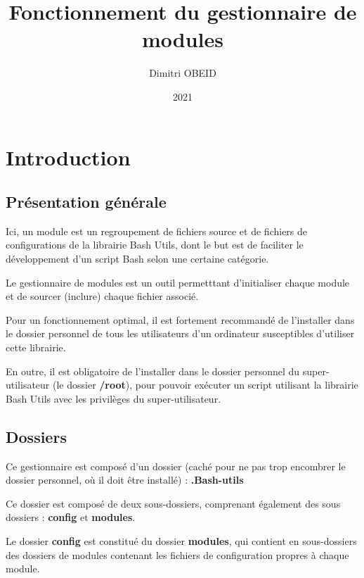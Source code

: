 \documentclass[a4paper,10pt]{article}
\title{\color{red}Fonctionnement du gestionnaire de modules}\color{white}
\author{Dimitri OBEID}
\date{2021}
\begin{document}
 \maketitle
 \tableofcontents
 \newpage

 \color{red}
 \section{Introduction}\color{white}

  \color{green}
  \subsection{Présentation générale}\color{white}
  Ici, un module est un regroupement de fichiers source et de fichiers de configurations de la librairie Bash Utils, dont le but est de faciliter le développement d'un script Bash selon une certaine catégorie.\linebreak

  Le gestionnaire de modules est un outil permetttant d'initialiser chaque module et de sourcer (inclure) chaque fichier associé.\linebreak

  Pour un fonctionnement optimal, il est fortement recommandé de l'installer dans le dossier personnel de tous les utilisateurs d'un ordinateur susceptibles d'utiliser cette librairie.\linebreak

  En outre, il est obligatoire de l'installer dans le dossier personnel du super-utilisateur (le dossier \textbf{\color{lime}/root\color{white}}), pour pouvoir exécuter un script utilisant la librairie Bash Utils avec les privilèges du super-utilisateur.

  \color{green}
  \subsection{Dossiers}\color{white}
  Ce gestionnaire est composé d'un dossier (caché pour ne pas trop encombrer le dossier personnel, où il doit être installé) : \textbf{\color{lime}.Bash-utils\color{white}}\linebreak
  
  Ce dossier est composé de deux sous-dossiers, comprenant également des sous dossiers : \textbf{\color{lime}config\color{white}} et \textbf{\color{lime}modules\color{white}}.\linebreak

  Le dossier \textbf{\color{lime}config\color{white}} est constitué du dossier \textbf{\color{lime}modules\color{white}}, qui contient en sous-dossiers des dossiers de modules contenant les fichiers de configuration propres à chaque module.\linebreak
\end{document}
